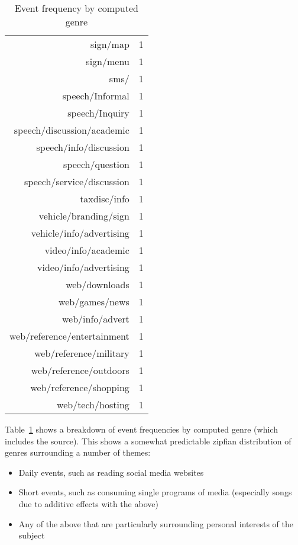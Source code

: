 \begin{table}[ht]
\begin{tabular}{rr}
  sign/map &   1 \\ 
  sign/menu &   1 \\ 
  sms/ &   1 \\ 
  speech/Informal &   1 \\ 
  speech/Inquiry &   1 \\ 
  speech/discussion/academic &   1 \\ 
  speech/info/discussion &   1 \\ 
  speech/question &   1 \\ 
  speech/service/discussion &   1 \\ 
  taxdisc/info &   1 \\ 
  vehicle/branding/sign &   1 \\ 
  vehicle/info/advertising &   1 \\ 
  video/info/academic &   1 \\ 
  video/info/advertising &   1 \\ 
  web/downloads &   1 \\ 
  web/games/news &   1 \\ 
  web/info/advert &   1 \\ 
  web/reference/entertainment &   1 \\ 
  web/reference/military &   1 \\ 
  web/reference/outdoors &   1 \\ 
  web/reference/shopping &   1 \\ 
  web/tech/hosting &   1 \\ 
   \hline
\end{tabular}
\caption{Event frequency by computed genre}
\label{table:personal:eventcountbygenre}
\end{table}


Table~\ref{table:personal:eventcountbygenre} shows a breakdown of event frequencies by computed genre  (which includes the source).  This shows a somewhat predictable zipfian distribution of genres surrounding a number of themes:

\begin{itemize}
    \item Daily events, such as reading social media websites
    \item Short events, such as consuming single programs of media (especially songs due to additive effects with the above)
    \item Any of the above that are particularly surrounding personal interests of the subject
\end{itemize}

